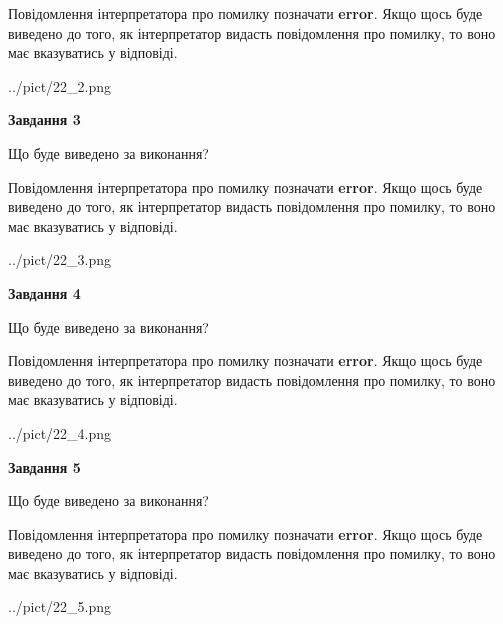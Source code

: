 \documentclass[12pt, ukrainian]{article}
\begin{document}
{\begin {large}
Повідомлення інтерпретатора про помилку позначати \textbf{error}.
Якщо щось буде виведено до того, як інтерпретатор видасть повідомлення про помилку, 
то воно має вказуватись у відповіді. \par


\begin{center}
	{../pict/22_2.png}
\end{center}
\newpage

{\begin {center}\textbf{Завдання 3}\end {center}}\par
Що буде виведено за виконання?

Повідомлення інтерпретатора про помилку позначати \textbf{error}.
Якщо щось буде виведено до того, як інтерпретатор видасть повідомлення про помилку, 
то воно має вказуватись у відповіді. \par


\begin{center}
	{../pict/22_3.png}
\end{center}
\newpage

{\begin {center}\textbf{Завдання 4}\end {center}}\par
Що буде виведено за виконання?

Повідомлення інтерпретатора про помилку позначати \textbf{error}.
Якщо щось буде виведено до того, як інтерпретатор видасть повідомлення про помилку, 
то воно має вказуватись у відповіді. \par


\begin{center}
	{../pict/22_4.png}
\end{center}
\newpage

{\begin {center}\textbf{Завдання 5}\end {center}}\par
Що буде виведено за виконання?

Повідомлення інтерпретатора про помилку позначати \textbf{error}.
Якщо щось буде виведено до того, як інтерпретатор видасть повідомлення про помилку, 
то воно має вказуватись у відповіді. \par


\begin{center}
	{../pict/22_5.png}
\end{center}
\newpage


\end{large}}
\end{document}
